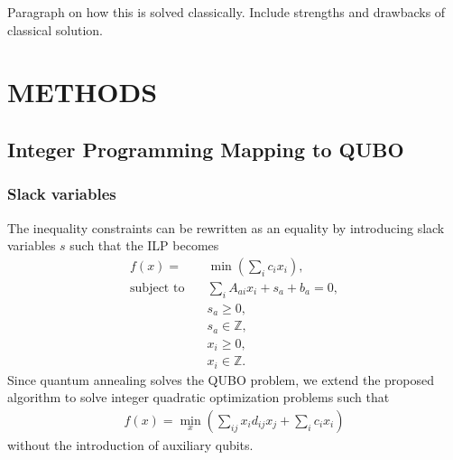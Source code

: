 \documentclass[prd,twocolumn,tightenlines,preprintnumbers,showpacs,superscriptaddress,notitlepage,nofootinbib,eqsecnum,floatfix,longbibliography]{revtex4}
\begin{document}
{\color{red} Paragraph on how this is solved classically.
Include strengths and drawbacks of classical solution.}

\section{METHODS}
\label{sec:methods}

\subsection{Integer Programming Mapping to QUBO}
\label{sec:methods:ilp}

\subsubsection{Slack variables}
\label{sec:methods:slack}


The inequality constraints can be rewritten as an equality by introducing slack variables $s$ such that the ILP becomes
{\color{blue}
\begin{align}
    f(x) = &\min(\sum_i c_i x_i),\\
    \textrm{subject to} \quad & \sum_i A_{a i}x_i + s_a + b_a = 0,\\
    & s_a \geq 0,\\
    & s_a \in \mathbb{Z},\\
    & x_i \geq 0,\\
    & x_i \in \mathbb{Z}.
\end{align}
}
Since quantum annealing solves the QUBO problem, we extend the proposed algorithm to solve integer quadratic optimization problems such that
{\color{blue}
\begin{align}
    f(x) = \min\limits_{x}(\sum_{ij} x_i d_{ij} x_j + \sum_i c_i x_i)
\end{align}
}
without the introduction of auxiliary qubits.

\end{document}
